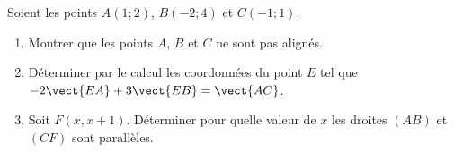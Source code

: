 
\begin{exercice}\label{exosmath-0664}

    Soient les points \( A(1;2)\), \( B(-2;4)\) et \( C(-1;1)\).
    \begin{enumerate}
        \item
            Montrer que les points \( A\), \( B\) et \( C\) ne sont pas alignés.
        \item
            Déterminer par le calcul les coordonnées du point \( E\) tel que \( -2\vect{ EA }+3\vect{ EB }=\vect{ AC }\).
        \item
            Soit \( F(x,x+1)\). Déterminer pour quelle valeur de \( x\) les droites \( (AB)\) et \( (CF)\) sont parallèles.
    \end{enumerate}

\end{exercice}

